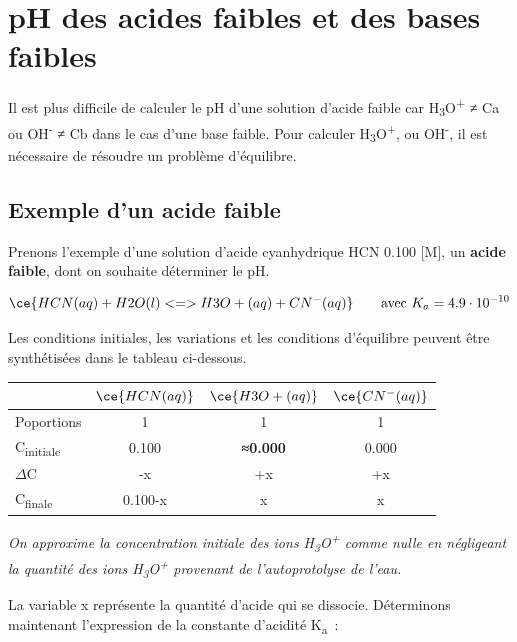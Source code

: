 \documentclass[
  11pt,
  a4paper,
  openany]{book}
\begin{document}
\clearpage

\hypertarget{ph-des-acides-faibles-et-des-bases-faibles}{%
\section{pH des acides faibles et des bases faibles}\label{ph-des-acides-faibles-et-des-bases-faibles}}

Il est plus difficile de calculer le pH d'une solution d'acide faible car \textbar H\textsubscript{3}O\textsuperscript{+}\textbar{} ≠ Ca ou \textbar OH\textsuperscript{-}\textbar{} ≠ Cb dans le cas d'une base faible. Pour calculer \textbar H\textsubscript{3}O\textsuperscript{+}\textbar, ou \textbar OH\textsuperscript{-}\textbar, il est nécessaire de résoudre un problème d'équilibre.

\hypertarget{exemple-dun-acide-faible}{%
\subsection{Exemple d'un acide faible}\label{exemple-dun-acide-faible}}

Prenons l'exemple d'une solution d'acide cyanhydrique HCN 0.100 {[}M{]}, un \textbf{acide faible}, dont on souhaite déterminer le pH.

\[
\ce{HCN(aq) + H2O(l) <=> H3O+(aq) + CN^{-}(aq)} \qquad \text{avec } K_a = 4.9 \cdot 10^{-10}
\]

Les conditions initiales, les variations et les conditions d'équilibre peuvent être synthétisées dans le tableau ci-dessous.

\begin{longtable}[]{@{}lccc@{}}
\toprule()
& \(\ce{HCN(aq)}\) & \(\ce{H3O+(aq)}\) & \(\ce{CN^{-}(aq)}\) \\
\midrule()
\endhead
Poportions & 1 & 1 & 1 \\
C\textsubscript{initiale} & 0.100 & \textbf{≈0.000} & 0.000 \\
\(\Delta\)C & -x & +x & +x \\
C\textsubscript{finale} & 0.100-x & x & x \\
\bottomrule()
\end{longtable}

\emph{On approxime la concentration initiale des ions H\textsubscript{3}O\textsuperscript{+} comme nulle en négligeant la quantité des ions H\textsubscript{3}O\textsuperscript{+} provenant de l'autoprotolyse de l'eau.}

La variable x représente la quantité d'acide qui se dissocie. Déterminons maintenant l'expression de la constante d'acidité K\textsubscript{a}~:
\end{document}
